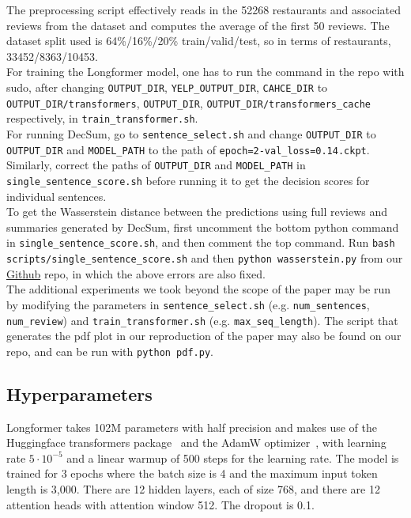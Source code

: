 \documentclass{article}
\begin{document}
The preprocessing script effectively reads in the 52268 restaurants and associated reviews from the dataset and computes the average of the first 50 reviews. The dataset split used is
64\%/16\%/20\% train/valid/test, so in terms of restaurants, 33452/8363/10453. \\

For training the Longformer model, one has to run the command in the repo with sudo, after changing \texttt{OUTPUT\_DIR}, \texttt{YELP\_OUTPUT\_DIR}, \texttt{CAHCE\_DIR} to
\texttt{OUTPUT\_DIR/transformers}, \texttt{OUTPUT\_DIR}, \texttt{OUTPUT\_DIR/transformers\_cache} respectively, in \texttt{train\_transformer.sh}. \\

For running DecSum, go to \texttt{sentence\_select.sh} and change \texttt{OUTPUT\_DIR} to \texttt{OUTPUT\_DIR} and \texttt{MODEL\_PATH} to the path of \texttt{epoch=2-val\_loss=0.14.ckpt}. Similarly,
correct the paths of \texttt{OUTPUT\_DIR} and \texttt{MODEL\_PATH} in \texttt{single\_sentence\_score.sh} before running it to get the decision scores for individual sentences. \\

To get the Wasserstein distance between the predictions using full reviews and summaries generated by DecSum, first uncomment the bottom python command in \texttt{single\_sentence\_score.sh}, and then
comment the top command. Run \texttt{bash scripts/single\_sentence\_score.sh} and then \texttt{python wasserstein.py} from our \href{https://github.com/ericxiaseattle/CSE517-Project}{Github} repo,
in which the above errors are also fixed. \\

The additional experiments we took beyond the scope of the paper may be run by modifying the parameters in \texttt{sentence\_select.sh} (e.g. \texttt{num\_sentences}, \texttt{num\_review}) and
\texttt{train\_transformer.sh} (e.g. \texttt{max\_seq\_length}). The script that generates the pdf plot in our reproduction of the paper may also be found on our repo, and can be run with
\texttt{python pdf.py}.

\subsection{Hyperparameters}

Longformer takes 102M parameters with half precision and makes use of the Huggingface transformers package~\cite{wolf-etal-2020-transformers} and the
AdamW optimizer~\cite{DBLP:journals/corr/abs-1711-05101}, with learning rate $5\cdot 10^{-5}$ and a linear warmup of 500 steps for the learning rate. The model is trained for 3 epochs where
the batch size is 4 and the maximum input token length is 3,000. There are 12 hidden layers, each of size 768, and there are 12 attention heads with attention window 512. The dropout is 0.1. \\
\end{document}
